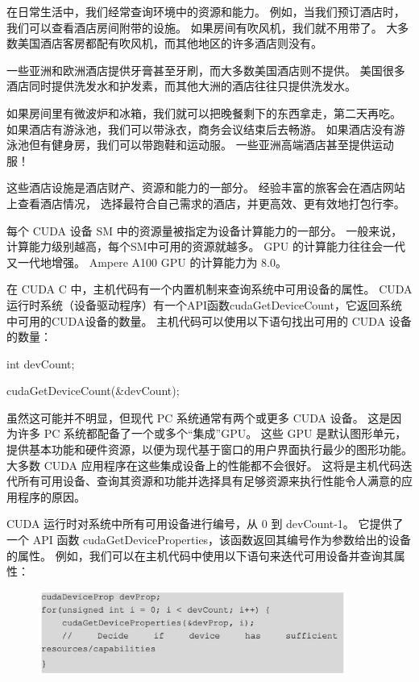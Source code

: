 \begin{remark}[资源和能力查询]
在日常生活中，我们经常查询环境中的资源和能力。 例如，当我们预订酒店时，我们可以查看酒店房间附带的设施。 
如果房间有吹风机，我们就不用带了。 大多数美国酒店客房都配有吹风机，而其他地区的许多酒店则没有。

一些亚洲和欧洲酒店提供牙膏甚至牙刷，而大多数美国酒店则不提供。 
美国很多酒店同时提供洗发水和护发素，而其他大洲的酒店往往只提供洗发水。

如果房间里有微波炉和冰箱，我们就可以把晚餐剩下的东西拿走，第二天再吃。 
如果酒店有游泳池，我们可以带泳衣，商务会议结束后去畅游。 如果酒店没有游泳池但有健身房，我们可以带跑鞋和运动服。 
一些亚洲高端酒店甚至提供运动服！

这些酒店设施是酒店财产、资源和能力的一部分。 经验丰富的旅客会在酒店网站上查看酒店情况，
选择最符合自己需求的酒店，并更高效、更有效地打包行李。
\end{remark}

每个 CUDA 设备 SM 中的资源量被指定为设备计算能力的一部分。 一般来说，计算能力级别越高，每个SM中可用的资源就越多。 
GPU 的计算能力往往会一代又一代地增强。 Ampere A100 GPU 的计算能力为 8.0。

在 CUDA C 中，主机代码有一个内置机制来查询系统中可用设备的属性。 
CUDA运行时系统（设备驱动程序）有一个API函数cudaGetDeviceCount，它返回系统中可用的CUDA设备的数量。 
主机代码可以使用以下语句找出可用的 CUDA 设备的数量：

int devCount;

cudaGetDeviceCount(\&devCount);

虽然这可能并不明显，但现代 PC 系统通常有两个或更多 CUDA 设备。 这是因为许多 PC 系统都配备了一个或多个“集成”GPU。 
这些 GPU 是默认图形单元，提供基本功能和硬件资源，以便为现代基于窗口的用户界面执行最少的图形功能。 
大多数 CUDA 应用程序在这些集成设备上的性能都不会很好。 
这将是主机代码迭代所有可用设备、查询其资源和功能并选择具有足够资源来执行性能令人满意的应用程序的原因。

CUDA 运行时对系统中所有可用设备进行编号，从 0 到 devCount-1。 
它提供了一个 API 函数 cudaGetDeviceProperties，该函数返回其编号作为参数给出的设备的属性。 
例如，我们可以在主机代码中使用以下语句来迭代可用设备并查询其属性：

\begin{figure}[H]
	\centering
	\includegraphics[width=0.9\textwidth]{figs/F4-a.3.png}
\end{figure}

